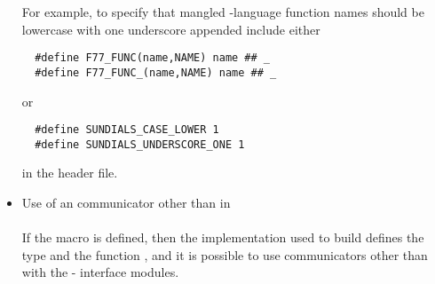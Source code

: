 \begin{itemize}
  For example, to specify that mangled {\C}-language function names should be lowercase with one
  underscore appended include either
\begin{verbatim}
  #define F77_FUNC(name,NAME) name ## _
  #define F77_FUNC_(name,NAME) name ## _
\end{verbatim}
  or
\begin{verbatim}
  #define SUNDIALS_CASE_LOWER 1
  #define SUNDIALS_UNDERSCORE_ONE 1
\end{verbatim}
  in the  header file.

\item Use of an {\mpi} communicator other than  in {\F}\\ \\
  If the macro  is defined, then the {\mpi} implementation
  used to build {\sundials} defines the type  and the function ,
  and it is possible to use {\mpi} communicators other than  with the
  {\F}-{\C} interface modules.
\end{itemize}


